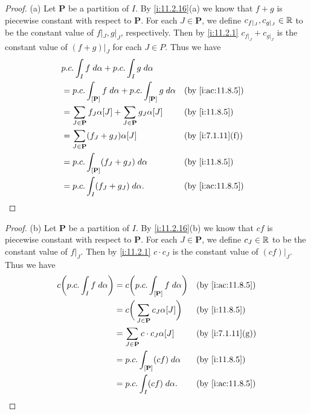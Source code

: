 \begin{proof}{(a)}
  Let \(\mathbf{P}\) be a partition of \(I\).
  By \cref{i:11.2.16}(a) we know that \(f + g\) is piecewise constant with respect to \(\mathbf{P}\).
  For each \(J \in \mathbf{P}\), we define \(c_{f|_J}, c_{g|_J} \in \mathbb{R}\) to be the constant value of \(f|_J, g|_J\), respectively.
  Then by \cref{i:11.2.1} \(c_{f|_J} + c_{g|_J}\) is the constant value of \((f + g)|_J\) for each \(J \in P\).
  Thus we have
  \begin{align*}
     & p.c. \int_I f \; d \alpha + p.c. \int_I g \; d \alpha                                                   \\
     & = p.c. \int_{[\mathbf{P}]} f \; d \alpha + p.c. \int_{[\mathbf{P}]} g \; d \alpha &  & \by{i:ac:11.8.5} \\
     & = \sum_{J \in \mathbf{P}} f_J \alpha[J] + \sum_{J \in \mathbf{P}} g_J \alpha[J]   &  & \by{i:11.8.5}    \\
     & = \sum_{J \in \mathbf{P}} (f_J + g_J) \alpha[J]                                   &  & \by{i:7.1.11}[f] \\
     & = p.c. \int_{[\mathbf{P}]} (f_J + g_J) \; d \alpha                                &  & \by{i:11.8.5}    \\
     & = p.c. \int_I (f_J + g_J) \; d \alpha.                                            &  & \by{i:ac:11.8.5}
  \end{align*}
\end{proof}

\begin{proof}{(b)}
  Let \(\mathbf{P}\) be a partition of \(I\).
  By \cref{i:11.2.16}(b) we know that \(cf\) is piecewise constant with respect to \(\mathbf{P}\).
  For each \(J \in \mathbf{P}\), we define \(c_J \in \mathbb{R}\) to be the constant value of \(f|_J\).
  Then by \cref{i:11.2.1} \(c \cdot c_J\) is the constant value of \((cf)|_J\).
  Thus we have
  \begin{align*}
    c \bigg(p.c. \int_I f \; d \alpha\bigg) & = c \bigg(p.c. \int_{[\mathbf{P}]} f \; d \alpha\bigg) &  & \by{i:ac:11.8.5} \\
                                            & = c \bigg(\sum_{J \in \mathbf{P}} c_J \alpha[J]\bigg)  &  & \by{i:11.8.5}    \\
                                            & = \sum_{J \in \mathbf{P}} c \cdot c_J \alpha[J]        &  & \by{i:7.1.11}[g] \\
                                            & = p.c. \int_{[\mathbf{P}]} (c f) \; d \alpha           &  & \by{i:11.8.5}    \\
                                            & = p.c. \int_I (c f) \; d \alpha.                       &  & \by{i:ac:11.8.5}
  \end{align*}
\end{proof}

